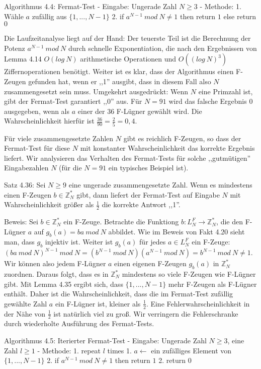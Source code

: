 \documentclass[a4paper]{article}
\begin{document}
\begin{multicols}{3}
Algorithmus 4.4: Fermat-Test
- Eingabe: Ungerade Zahl $N\geq 3$
- Methode:
  1. Wähle $a$ zufällig aus $\{1,...,N-1\}$
  2. if $a^{N-1}\ mod\ N\not= 1$ then return $1$ else return $0$

Die Laufzeitanalyse liegt auf der Hand: Der teuerste Teil ist die Berechnung der Potenz $a^{N-1}\ mod\ N$ durch schnelle Exponentiation, die nach den Ergebnissen von Lemma 4.14 $O(log\ N)$ arithmetische Operationen und $O((log\ N)^3)$ Ziffernoperationen benötigt. Weiter ist es klar, dass der Algorithmus einen F-Zeugen gefunden hat, wenn er ,,1'' ausgibt, dass in diesem Fall also $N$ zusammengesetzt sein muss. Umgekehrt ausgedrückt: Wenn $N$ eine Primzahl ist, gibt der Fermat-Test garantiert ,,0'' aus. Für $N=91$ wird das falsche Ergebnis $0$ ausgegeben, wenn als $a$ einer der 36 F-Lügner gewählt wird. Die Wahrscheinlichkeit hierfür ist $\frac{36}{90} =\frac{2}{5} = 0,4$.

Für viele zusammengesetzte Zahlen $N$ gibt es reichlich F-Zeugen, so dass der Fermat-Test für diese $N$ mit konstanter Wahrscheinlichkeit das korrekte Ergebnis liefert. Wir analysieren das Verhalten des Fermat-Tests für solche ,,gutmütigen'' Eingabezahlen $N$ (für die $N=91$ ein typisches Beispiel ist).

Satz 4.36: Sei $N\geq 9$ eine ungerade zusammengesetzte Zahl. Wenn es mindestens einen F-Zeugen $b\in\mathbb{Z}^*_N$ gibt, dann liefert der Fermat-Test auf Eingabe $N$ mit Wahrscheinlichkeit größer als $\frac{1}{2}$ die korrekte Antwort ,,1''.

Beweis: Sei $b\in\mathbb{Z}^*_N$ ein F-Zeuge. Betrachte die Funktiong $b:L^F_N\rightarrow\mathbb{Z}^*_N$, die den F-Lügner $a$ auf $g_b(a) =ba\ mod\ N$ abbildet. Wie im Beweis von Fakt 4.20 sieht man, dass $g_b$ injektiv ist. Weiter ist $g_b(a)$ für jedes $a\in L^F_N$ ein F-Zeuge: $(ba\ mod\ N)^{N-1}\ mod\ N= (b^{N-1}\ mod\ N)(a^{N-1}\ mod\ N) =b^{N-1}\ mod\ N\not= 1$.
Wir können also jedem F-Lügner $a$ einen eigenen F-Zeugen $g_b(a)$ in $\mathbb{Z}^*_N$ zuordnen. Daraus folgt, dass es in $\mathbb{Z}^*_N$ mindestens so viele F-Zeugen wie F-Lügner gibt. Mit Lemma 4.35 ergibt sich, dass $\{1,...,N-1\}$ mehr F-Zeugen als F-Lügner enthält. Daher ist die Wahrscheinlichkeit, dass die im Fermat-Test zufällig gewählte Zahl $a$ ein F-Lügner ist, kleiner als $\frac{1}{2}$. 
Eine Fehlerwahrscheinlichkeit in der Nähe von $\frac{1}{2}$ ist natürlich viel zu groß. Wir verringern die Fehlerschranke durch wiederholte Ausführung des Fermat-Tests.

Algorithmus 4.5: Iterierter Fermat-Test
- Eingabe: Ungerade Zahl $N\geq 3$, eine Zahl $l\geq 1$
- Methode:
  1. repeat $l$ times
     1. $a\leftarrow$ ein zufälliges Element von $\{1 ,...,N-1\}$
     2. if $a^{N-1}\ mod\ N\not= 1$ then return $1$
  2. return 0


\end{multicols}
\end{document}
